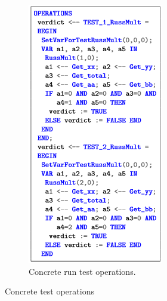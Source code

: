 \documentclass[runningheads]{llncs}
\begin{document}
\begin{figure}[ht]
\begin{minipage}{0.5\textwidth}
\begin{subfigure}{\textwidth}
\label{fig:SetTestModel}
\end{subfigure}
\end{minipage}
\begin{subfigure}{0.49\textwidth}
\centering
\includegraphics[width = \textwidth]{imagens/concreteRunTest.png}
\caption{Concrete run test operations.}
\label{fig:RunTestModel}
\end{subfigure}
\caption{Concrete test operations}
\end{figure}
\end{document}
